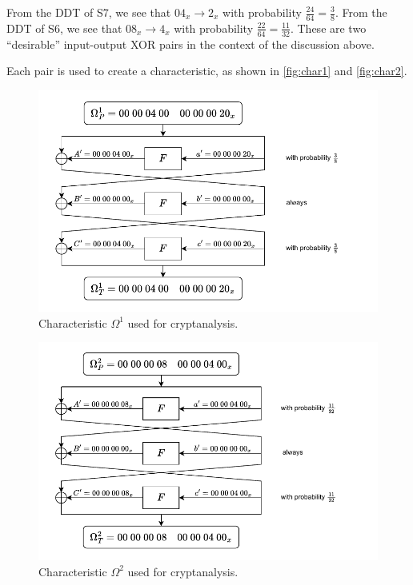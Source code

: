 \documentclass[journal,12pt,twocolumn]{IEEEtran}
\begin{document}
From the DDT of S7, we see that \(04_x \rightarrow 2_x\) with probability
\(\frac{24}{64} = \frac{3}{8}\). From the DDT of S6, we see that \(08_x
\rightarrow 4_x\) with probability \(\frac{22}{64} = \frac{11}{32}\). These are
two ``desirable'' input-output XOR pairs in the context of the discussion above.

Each pair is used to create a characteristic, as shown in \autoref{fig:char1}
and \autoref{fig:char2}.

\begin{figure}[!ht]
    \centering
    \includegraphics[width=\columnwidth]{images/char1.pdf}
    \caption{Characteristic \(\Omega^1\) used for cryptanalysis.}
    \label{fig:char1}
\end{figure}

\begin{figure}[!ht]
    \centering
    \includegraphics[width=\columnwidth]{images/char2.pdf}
    \caption{Characteristic \(\Omega^2\) used for cryptanalysis.}
    \label{fig:char2}
\end{figure}
\end{document}
